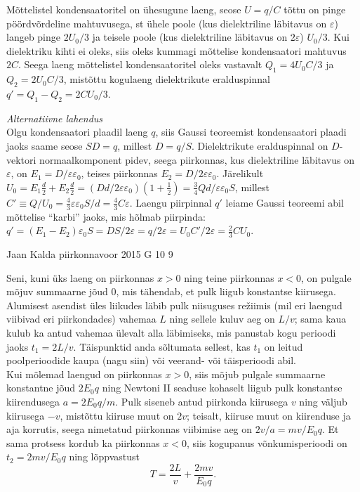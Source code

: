 \documentclass[11pt, twoside]{article}
\begin{document}
{{Mõttelistel kondensaatoritel on ühesugune laeng, seose $U=q/C$ tõttu on pinge pöördvõrdeline mahtuvusega, st ühele poole (kus dielektriline läbitavus  on $\varepsilon$) langeb pinge $2U_0/3$ ja teisele poole (kus dielektriline läbitavus on $2\varepsilon$) $U_0/3$. Kui dielektriku kihti ei oleks, siis oleks kummagi mõttelise kondensaatori mahtuvus $2C$. Seega laeng mõttelistel kondensaatoritel oleks vastavalt $Q_1=4U_0C/3$ ja $Q_2=2U_0C/3$, mistõttu kogulaeng dielektrikute eralduspinnal $q'=Q_1-Q_2=2CU_0/3$.
\vspace{0.5\baselineskip}

\emph{Alternatiivne lahendus}\\
Olgu kondensaatori plaadil laeng $q$, siis Gaussi teoreemist kondensaatori plaadi jaoks saame seose $SD=q$, millest $D=q/S$. Dielektrikute eralduspinnal on $D$-vektori normaalkomponent pidev, seega piirkonnas, kus dielektriline läbitavus on $\varepsilon$, on $E_1=D/\varepsilon\varepsilon_0$, teises piirkonnas $E_2=D/2\varepsilon\varepsilon_0$. Järelikult $U_0=E_1\frac d2+E_2\frac d2=(Dd/2\varepsilon\varepsilon_0)(1+\frac 12)=\frac 34Qd/\varepsilon\varepsilon_0S$, millest $C'\equiv Q/U_0=\frac 43\varepsilon\varepsilon_0S/d=\frac 43C\varepsilon$. Laengu piirpinnal $q'$ leiame Gaussi teoreemi abil mõttelise \enquote{karbi} jaoks, mis hõlmab piirpinda: $q'=(E_1-E_2)\varepsilon_0S=DS/2\varepsilon=q/2\varepsilon=U_0C'/2\varepsilon=\frac 23CU_0$.
\fi
}

{Jaan Kalda} %
{piirkonnavoor} %
{2015} %
{G 10} %
{9} %
{

\ifSolution
\osa Seni, kuni üks laeng on piirkonnas $x>0$ ning teine piirkonnas $x<0$, on pulgale mõjuv summaarne jõud \num{0}, mis tähendab, et pulk liigub konstantse kiirusega. \\
Alumisest asendist üles liikudes läbib pulk niisuguses re\v ziimis
(mil eri laengud viibivad eri piirkondades) vahemaa $L$ ning
sellele kuluv aeg on $L/v$; sama kaua kulub ka antud vahemaa ülevalt alla
läbimiseks, mis  panustab kogu perioodi jaoks $t_1=2L/v$.
Täispunktid anda sõltumata sellest, kas $t_1$ on leitud poolperioodide kaupa (nagu siin) või veerand- või täisperioodi abil.\\
Kui mõlemad laengud on piirkonnas $x> 0$, siis mõjub pulgale summaarne konstantne jõud $2E_0q$
ning Newtoni II seaduse kohaselt liigub pulk konstantse kiirendusega
$a=2E_0q/m$. Pulk siseneb antud piirkonda kiirusega $v$ ning väljub kiirusega $-v$, mistõttu kiiruse muut on $2v$; teisalt,
kiiruse muut on kiirenduse ja aja korrutis, seega nimetatud piirkonnas viibimise
aeg on $2v/a=mv/E_0q$. Et sama protsess kordub ka piirkonnas $x<0$, siis
kogupanus võnkumisperioodi on $t_2=2mv/E_0q$ ning lõppvastust
\[ T=\frac{2L}v+\frac {2mv}{E_0q}. \]

}}
\end{document}
